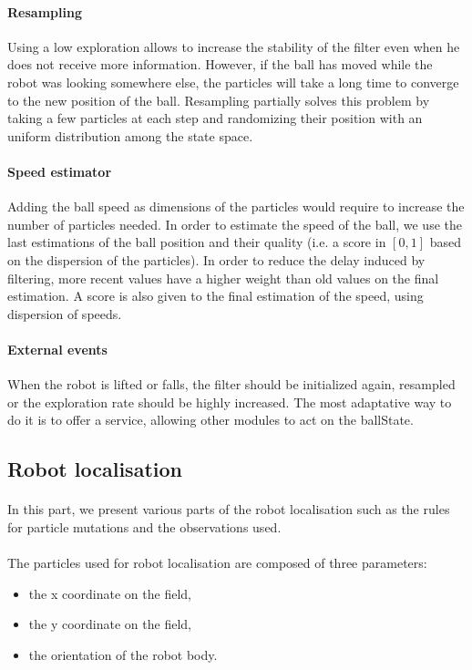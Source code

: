\documentclass[a4paper,12pt]{article}
\begin{document}
\paragraph{Resampling}
Using a low exploration allows to increase the stability of the filter even when
he does not receive more information. However, if the ball has moved while the
robot was looking somewhere else, the particles will take a long time to
converge to the new position of the ball. Resampling partially solves this
problem by taking a few particles at each step and randomizing their position
with an uniform distribution among the state space.

\paragraph{\label{sec:SpeedEstimator}Speed estimator}
Adding the ball speed as dimensions of the particles would require to increase
the number of particles needed. In order to estimate the speed of the ball, we
use the last estimations of the ball position and their quality (i.e. a score
in $[0,1]$ based on the dispersion of the particles). In order to reduce the
delay induced by filtering, more recent values have a higher weight than old
values on the final estimation. A score is also given to the final estimation
of the speed, using dispersion of speeds.

\paragraph{External events}
When the robot is lifted or falls, the filter should be initialized again,
resampled or the exploration rate should be highly increased. The most
adaptative way to do it is to offer a service, allowing other modules to
act on the ballState.

\subsection{Robot localisation}
\paragraph{}
In this part, we present various parts of the robot localisation such as the
rules for particle mutations and the observations used.
\paragraph{}
The particles used for robot localisation are composed of three parameters:
\begin{itemize}
\item the x coordinate on the field,
\item the y coordinate on the field,
\item the orientation of the robot body.
\end{itemize}
\end{document}
